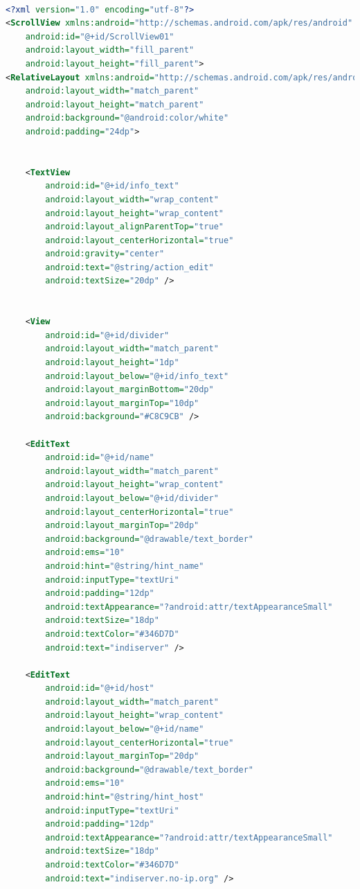 \begin{lstlisting}[language=XML,caption={Vista de edición  XML de una propiedad},label={lst:lst:xml_edit_view}]

<?xml version="1.0" encoding="utf-8"?>
<ScrollView xmlns:android="http://schemas.android.com/apk/res/android"
    android:id="@+id/ScrollView01"
    android:layout_width="fill_parent"
    android:layout_height="fill_parent">
<RelativeLayout xmlns:android="http://schemas.android.com/apk/res/android"
    android:layout_width="match_parent"
    android:layout_height="match_parent"
    android:background="@android:color/white"
    android:padding="24dp">


    <TextView
        android:id="@+id/info_text"
        android:layout_width="wrap_content"
        android:layout_height="wrap_content"
        android:layout_alignParentTop="true"
        android:layout_centerHorizontal="true"
        android:gravity="center"
        android:text="@string/action_edit"
        android:textSize="20dp" />


    <View
        android:id="@+id/divider"
        android:layout_width="match_parent"
        android:layout_height="1dp"
        android:layout_below="@+id/info_text"
        android:layout_marginBottom="20dp"
        android:layout_marginTop="10dp"
        android:background="#C8C9CB" />

    <EditText
        android:id="@+id/name"
        android:layout_width="match_parent"
        android:layout_height="wrap_content"
        android:layout_below="@+id/divider"
        android:layout_centerHorizontal="true"
        android:layout_marginTop="20dp"
        android:background="@drawable/text_border"
        android:ems="10"
        android:hint="@string/hint_name"
        android:inputType="textUri"
        android:padding="12dp"
        android:textAppearance="?android:attr/textAppearanceSmall"
        android:textSize="18dp"
        android:textColor="#346D7D"
        android:text="indiserver" />

    <EditText
        android:id="@+id/host"
        android:layout_width="match_parent"
        android:layout_height="wrap_content"
        android:layout_below="@+id/name"
        android:layout_centerHorizontal="true"
        android:layout_marginTop="20dp"
        android:background="@drawable/text_border"
        android:ems="10"
        android:hint="@string/hint_host"
        android:inputType="textUri"
        android:padding="12dp"
        android:textAppearance="?android:attr/textAppearanceSmall"
        android:textSize="18dp"
        android:textColor="#346D7D"
        android:text="indiserver.no-ip.org" />


\end{lstlisting}
